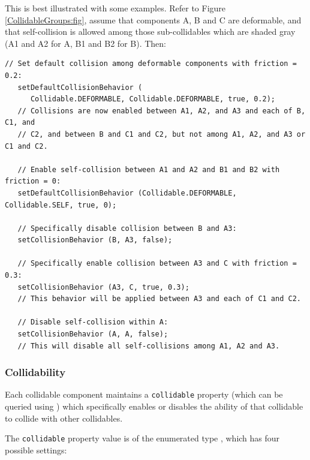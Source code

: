 This is best illustrated with some examples. Refer to Figure
\ref{CollidableGroups:fig}, assume that components A, B and C are
deformable, and that self-collision is allowed among those
sub-collidables which are shaded gray (A1 and A2 for A, B1 and B2 for
B). Then:
%
\begin{lstlisting}[]
   // Set default collision among deformable components with friction = 0.2:
   setDefaultCollisionBehavior (
      Collidable.DEFORMABLE, Collidable.DEFORMABLE, true, 0.2);
   // Collisions are now enabled between A1, A2, and A3 and each of B, C1, and
   // C2, and between B and C1 and C2, but not among A1, A2, and A3 or C1 and C2.

   // Enable self-collision between A1 and A2 and B1 and B2 with friction = 0:
   setDefaultCollisionBehavior (Collidable.DEFORMABLE, Collidable.SELF, true, 0);
    
   // Specifically disable collision between B and A3:
   setCollisionBehavior (B, A3, false);

   // Specifically enable collision between A3 and C with friction = 0.3:
   setCollisionBehavior (A3, C, true, 0.3);
   // This behavior will be applied between A3 and each of C1 and C2.

   // Disable self-collision within A:
   setCollisionBehavior (A, A, false);
   // This will disable all self-collisions among A1, A2 and A3.
\end{lstlisting}
%

\subsubsection{Collidability}
\label{collidability:sec}

Each collidable component maintains a {\tt collidable} property
(which can be queried using
)
which specifically enables or disables the ability of that collidable
to collide with other collidables.

The {\tt collidable} property value is of the enumerated type
, which
has four possible settings:

